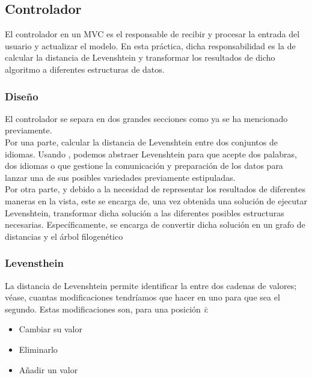\subsection{Controlador}
El controlador en un MVC es el responsable de recibir y procesar la entrada del usuario y actualizar el modelo. En esta práctica, dicha responsabilidad es la de calcular la distancia de Levenshtein y transformar los resultados de dicho algoritmo a diferentes estructuras de datos.

\subsubsection{Diseño}
El controlador se separa en dos grandes secciones como ya se ha mencionado previamente. \\

Por una parte, calcular la distancia de Levenshtein entre dos conjuntos de idiomas. Usando  \cite{Method Overloading}, podemos abstraer Levenshtein para que acepte dos palabras, dos idiomas o que gestione la comunicación y preparación de los datos para lanzar una de sus posibles variedades previamente estipuladas.\\

Por otra parte, y debido a la necesidad de representar los resultados de diferentes maneras en la vista, este se encarga de, una vez obtenida una solución de ejecutar Levenshtein, transformar dicha solución a las diferentes posibles estructuras necesarias. Específicamente, se encarga de convertir dicha solución en un  grafo de distancias y el árbol filogenético \cite{Phylogenetic tree}

\subsubsection{Levensthein}

La distancia de Levenshtein permite identificar la  entre dos cadenas de valores; véase, cuantas modificaciones tendríamos que hacer en uno para que sea el segundo. Estas modificaciones son, para una posición \textit{i}:\\

\begin{itemize}
    \item Cambiar su valor
    \item Eliminarlo
    \item Añadir un valor
\end{itemize}\bigskip

